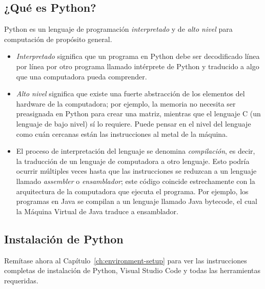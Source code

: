 
\subsection{¿Qué es Python?}

Python es un lenguaje de programación \textit{interpretado} y de \textit{alto nivel} para computación de propósito general.

\begin{itemize}
	\item{} \textit{Interpretado} significa que un programa en Python debe ser decodificado línea por línea por otro programa llamado intérprete de Python y traducido a algo que una computadora pueda comprender.
	\item{} \textit{Alto nivel} significa que existe una fuerte abstracción de los elementos del hardware de la computadora; por ejemplo, la memoria no necesita ser preasignada en Python para crear una matriz, mientras que el lenguaje C (un lenguaje de bajo nivel) sí lo requiere. Puede pensar en el nivel del lenguaje como cuán cercanas están las instrucciones al metal de la máquina.
	\item{} El proceso de interpretación del lenguaje se denomina \textit{compilación}, es decir, la traducción de un lenguaje de computadora a otro lenguaje. Esto podría ocurrir múltiples veces hasta que las instrucciones se reduzcan a un lenguaje llamado \textit{assembler} o \textit{ensamblador}; este código coincide estrechamente con la arquitectura de la computadora que ejecuta el programa. Por ejemplo, los programas en Java se compilan a un lenguaje llamado Java bytecode, el cual la Máquina Virtual de Java traduce a ensamblador.
\end{itemize}


\subsection{Instalación de Python}

Remítase ahora al Capítulo~\ref{ch:environment-setup} para ver las
instrucciones completas de instalación de Python, Visual Studio Code y
todas las herramientas requeridas.

